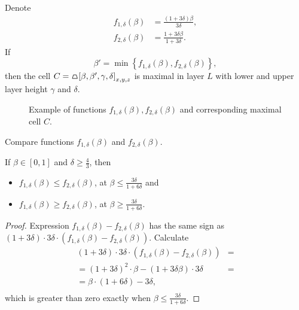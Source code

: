 \begin{proposition}
Denote
\begin{align}
\label{eq:f1_beta}
f_{1,\delta}(\beta) &= \frac{(1+3\delta)\beta}{3\delta},\\[6pt]
\label{eq:f2_beta}
f_{2,\delta}(\beta) &= \frac{1+3\delta\beta}{1+3\delta}.
\end{align}
If
$$
\beta' = \min\left\{ f_{1,\delta}(\beta), f_{2,\delta}(\beta) \right\},
$$
then the cell $C = \tpz{\left[ \beta,\beta',\gamma,\delta \right]_{x,y,z} }$ is maximal in layer $L$ with lower and upper layer height $\gamma$ and $\delta$.
\end{proposition}

\begin{figure}
\begin{center}

\end{center}
\caption{Example of functions $f_{1,\delta}(\beta), f_{2,\delta}(\beta)$ and corresponding maximal cell $C$.}
\label{fig: edge-layers-2}
\end{figure}

Compare functions $f_{1,\delta}(\beta)$ and $f_{2,\delta}(\beta)$.
\begin{proposition}
\label{prop: compare-functions-f1-f2}
If $\beta \in [0,1]$ and $\delta \geq \frac{4}{3}$, then
\begin{itemize}
  \item $f_{1,\delta}(\beta) \leq f_{2,\delta}(\beta)$, at $\beta \leq \frac{3\delta}{1 + 6\delta}$ and
  \item $f_{1,\delta}(\beta) \geq f_{2,\delta}(\beta)$, at $\beta \geq \frac{3\delta}{1 + 6\delta}$.
\end{itemize}
\end{proposition}

\begin{proof}
Expression $f_{1,\delta}(\beta) - f_{2,\delta}(\beta)$ has the same sign as $(1 + 3\delta) \cdot 3\delta \cdot (f_{1,\delta}(\beta) - f_{2,\delta}(\beta))$. Calculate
\begin{align*}
(1 + 3\delta) \cdot 3\delta \cdot (f_{1,\delta}(\beta) - f_{2,\delta}(\beta)) &= \\[6pt]%
= (1 + 3\delta)^{2} \cdot \beta - (1 + 3\delta\beta) \cdot 3\delta &= \\[6pt]%
= \beta \cdot (1 + 6\delta) - 3\delta, \\[6pt]%
\end{align*}
which is greater than zero exactly when $\beta \leq \frac{3\delta}{1+6\delta}$.
\end{proof}

